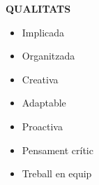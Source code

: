 \documentclass[../main.tex]{subfiles}
\begin{document}
\vspace*{0.6cm}

\textbf{\textcolor{myCV2}{QUALITATS\underline{\hspace{6.25cm}}}}

    \begin{itemize}
        \vspace*{-0.2cm}
        \item Implicada
        \vspace*{-0.2cm}
        \item Organitzada
        \vspace*{-0.2cm}
        \item Creativa 
        \vspace*{-0.2cm}
        \item Adaptable
        \vspace*{-0.2cm}
        \item Proactiva
        \vspace*{-0.2cm}
        \item Pensament crític
        \vspace*{-0.2cm}
        \item Treball en equip
    \end{itemize}
\end{document}
